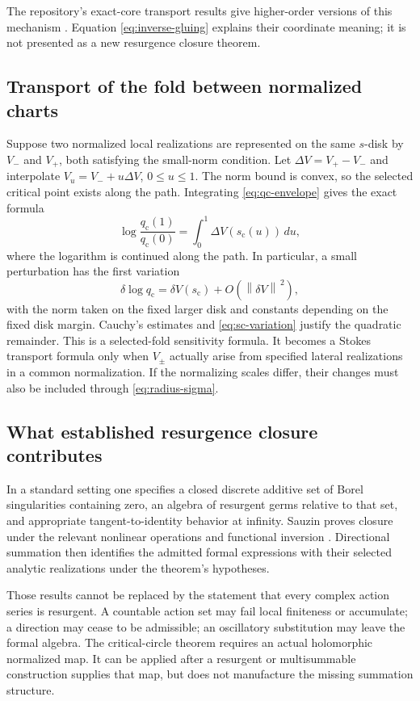\documentclass[11pt,a4paper]{article}
\numberwithin{equation}{section}
\theoremstyle{definition}
\theoremstyle{remark}
\newcommand{\scv}{s_{\mathrm c}}
\newcommand{\qcv}{q_{\mathrm c}}
\newcommand{\norm}[1]{\left\lVert#1\right\rVert}
\begin{document}
The repository's exact-core transport results give higher-order versions of this mechanism \cite{repo-stokes}. Equation \eqref{eq:inverse-gluing} explains their coordinate meaning; it is not presented as a new resurgence closure theorem.

\subsection{Transport of the fold between normalized charts}
Suppose two normalized local realizations are represented on the same $s$-disk by $V_-$ and $V_+$, both satisfying the small-norm condition. Let $\Delta V=V_+-V_-$ and interpolate $V_u=V_-+u\Delta V$, $0\leq u\leq1$. The norm bound is convex, so the selected critical point exists along the path. Integrating \eqref{eq:qc-envelope} gives the exact formula
\begin{equation}
 \log\frac{\qcv(1)}{\qcv(0)}
       =\int_0^1\Delta V(\scv(u))\,du,
 \label{eq:fold-jump}
\end{equation}
where the logarithm is continued along the path. In particular, a small perturbation has the first variation
\begin{equation}
 \delta\log\qcv=\delta V(\scv)
            +O(\norm{\delta V}^{\,2}),
 \label{eq:fold-linear}
\end{equation}
with the norm taken on the fixed larger disk and constants depending on the fixed disk margin. Cauchy's estimates and \eqref{eq:sc-variation} justify the quadratic remainder. This is a selected-fold sensitivity formula. It becomes a Stokes transport formula only when $V_\pm$ actually arise from specified lateral realizations in a common normalization. If the normalizing scales differ, their changes must also be included through \eqref{eq:radius-sigma}.

\subsection{What established resurgence closure contributes}
In a standard setting one specifies a closed discrete additive set of Borel singularities containing zero, an algebra of resurgent germs relative to that set, and appropriate tangent-to-identity behavior at infinity. Sauzin proves closure under the relevant nonlinear operations and functional inversion \cite{sauzin}. Directional summation then identifies the admitted formal expressions with their selected analytic realizations under the theorem's hypotheses.

Those results cannot be replaced by the statement that every complex action series is resurgent. A countable action set may fail local finiteness or accumulate; a direction may cease to be admissible; an oscillatory substitution may leave the formal algebra. The critical-circle theorem requires an actual holomorphic normalized map. It can be applied after a resurgent or multisummable construction supplies that map, but does not manufacture the missing summation structure.
\end{document}

